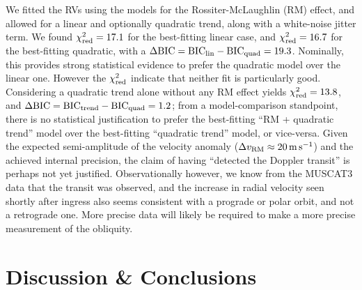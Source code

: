 \documentclass[12pt,modern,twocolumn,tighten]{aastex63}
\begin{document}
We fitted the RVs using the \citet{hirano_analytic_2010,hirano_2011}
models for the Rossiter-McLaughlin (RM) effect, and allowed for a
linear and optionally quadratic trend, along with a white-noise jitter
term.  We found $\chi^2_{\rm red} = 17.1$ for the best-fitting linear
case, and $\chi^2_{\rm red} = 16.7$ for the best-fitting quadratic,
with a $\Delta {\rm BIC} = {\rm BIC}_{\rm lin} - {\rm BIC}_{\rm quad}
= 19.3$.  Nominally, this provides strong statistical evidence to
prefer the quadratic model over the linear one.  However the
$\chi^2_{\rm red}$ indicate that neither fit is particularly good.
Considering a quadratic trend alone without any RM effect yields
$\chi^2_{\rm red} = 13.8$, and $\Delta {\rm BIC} = {\rm BIC}_{\rm
trend} - {\rm BIC}_{\rm quad} = 1.2$; from a model-comparison
standpoint, there is no statistical justification to prefer the
best-fitting ``RM + quadratic trend'' model over the best-fitting
``quadratic trend'' model, or vice-versa.  Given the expected
semi-amplitude of the velocity anomaly ($\Delta v_{\rm RM}\approx
20\,{\rm m\,s}^{-1}$) and the achieved internal precision, the claim
of having ``detected the Doppler transit'' is perhaps not yet
justified.  Observationally however, we know from the MUSCAT3 data
that the transit was observed, and the increase in radial velocity
seen shortly after ingress also seems consistent with a prograde or
polar orbit, and not a retrograde one.  More precise data will likely
be required to make a more precise measurement of the obliquity.



\section{Discussion \& Conclusions}
\label{sec:conc}
\end{document}
